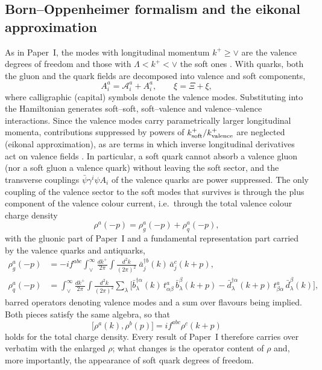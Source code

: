 \documentclass[11pt,a4paper]{article}
\numberwithin{equation}{section}
\newcommand{\dg}{\dagger}
\begin{document}
\subsection{Born--Oppenheimer formalism and the eikonal approximation}
\label{sec:BO}

As in Paper~I, the modes with longitudinal momentum $k^{+}\ge\vee$ are the valence degrees of
freedom and those with $\Lambda<k^{+}<\vee$ the soft ones \cite{McLerran:1993ni,McLerran:1993ka}.
With quarks, both the gluon and the quark fields are decomposed into valence and soft
components,
\begin{equation}
A^{a}_{i}=\mathcal A^{a}_{i}+A^{a}_{i},\qquad
\xi=\Xi+\xi ,
\label{eq:split}
\end{equation}
where calligraphic (capital) symbols denote the valence modes. Substituting into the Hamiltonian
generates soft--soft, soft--valence and valence--valence interactions. Since the valence modes
carry parametrically larger longitudinal momenta, contributions suppressed by powers of
$k^{+}_{\rm soft}/k^{+}_{\rm valence}$ are neglected (eikonal approximation), as are terms in which
inverse longitudinal derivatives act on valence fields \cite{Lublinsky:2016meo,PaperI}. In
particular, a soft quark cannot absorb a valence gluon (nor a soft gluon a valence quark) without
leaving the soft sector, and the transverse couplings $\bar\psi\gamma^{i}\psi A_{i}$ of the
valence quarks are power suppressed. The only coupling of the valence sector to the soft modes
that survives is through the plus component of the valence colour current, i.e.\ through the
total valence colour charge density
\begin{equation}
\rho^{a}(-p)=\rho^{a}_{g}(-p)+\rho^{a}_{q}(-p),
\label{eq:rho}
\end{equation}
with the gluonic part of Paper~I and a fundamental representation part carried by the valence
quarks and antiquarks,
\begin{align}
\rho^{a}_{g}(-p)&=-if^{abc}\!\int_{\vee}^{\infty}\!\frac{dk^{+}}{2\pi}\!\int\!\frac{d^{2}k}{(2\pi)^{2}}\;
\bar a^{\dg b}_{j}(k)\,\bar a^{c}_{j}(k+p),
\label{eq:rhog}\\
\rho^{a}_{q}(-p)&=\int_{\vee}^{\infty}\!\frac{dk^{+}}{2\pi}\!\int\!\frac{d^{2}k}{(2\pi)^{2}}
\sum_{\lambda}\Big[\bar b^{\dg\alpha}_{\lambda}(k)\,t^{a}_{\alpha\beta}\,\bar b^{\beta}_{\lambda}(k+p)
-\bar d^{\dg\alpha}_{\lambda}(k+p)\,t^{a}_{\beta\alpha}\,\bar d^{\beta}_{\lambda}(k)\Big],
\label{eq:rhoq}
\end{align}
barred operators denoting valence modes and a sum over flavours being implied. Both pieces
satisfy the same algebra, so that
\begin{equation}
\big[\rho^{a}(k),\rho^{b}(p)\big]=if^{abc}\rho^{c}(k+p)
\label{eq:rhoalg}
\end{equation}
holds for the total charge density. Every result of Paper~I therefore carries over verbatim
with the enlarged $\rho$; what changes is the operator content of $\rho$ and, more importantly,
the appearance of soft quark degrees of freedom.
\end{document}
